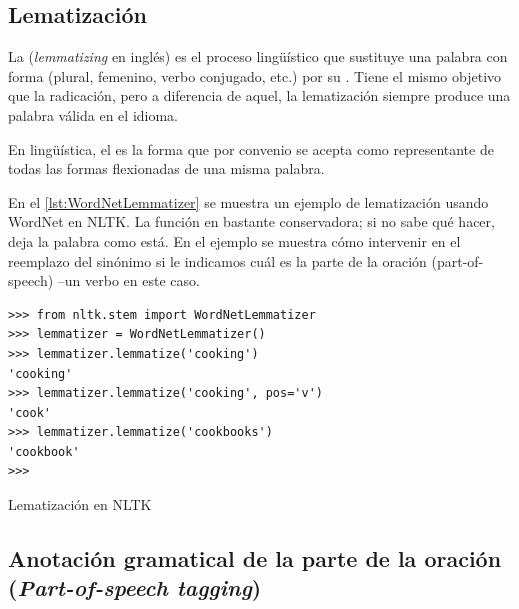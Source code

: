 \subsection{Lematización}

La  (\emph{lemmatizing} en inglés) es el proceso lingüístico que sustituye una palabra con forma  (plural, femenino, verbo conjugado, etc.) por su . Tiene el mismo objetivo que la radicación, pero a diferencia de aquel, la lematización siempre produce una palabra válida en el idioma.

\begin{definition}[Lema]
En lingüística, el  es la forma que por convenio se acepta como representante de todas las formas flexionadas de una misma palabra.
\end{definition}

En el \autoref{lst:WordNetLemmatizer} se muestra un ejemplo de lematización usando WordNet en NLTK. La función en bastante conservadora; si no sabe qué hacer, deja la palabra como está. En el ejemplo se muestra cómo intervenir en el reemplazo del sinónimo si le indicamos cuál es la parte de la oración (part-of-speech) --un verbo en este caso.

\begin{listing}[htbp]
\begin{verbatim}
>>> from nltk.stem import WordNetLemmatizer
>>> lemmatizer = WordNetLemmatizer()
>>> lemmatizer.lemmatize('cooking')
'cooking'
>>> lemmatizer.lemmatize('cooking', pos='v')
'cook'
>>> lemmatizer.lemmatize('cookbooks')
'cookbook'
>>> 
\end{verbatim}
\caption{Lematización en NLTK}
\label{lst:WordNetLemmatizer}
\end{listing}


\subsection{Anotación gramatical de la parte de la oración (\emph{Part-of-speech tagging}) }

